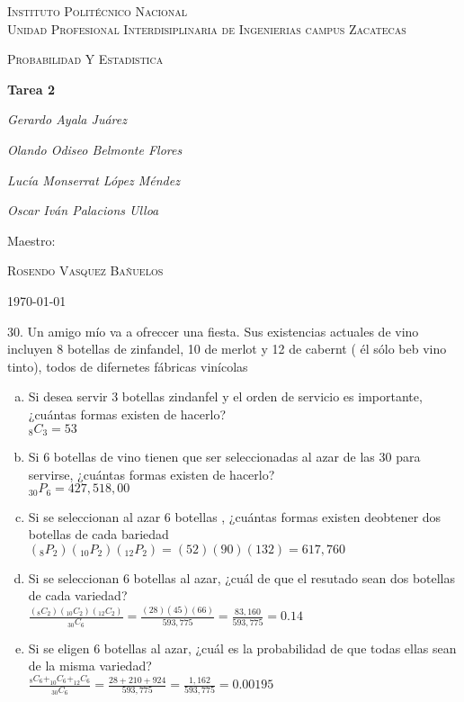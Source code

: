 \documentclass[12pt, letterpaper, spanish]{article}
\begin{document}
\begin{titlepage}
	\centering
	{\scshape\LARGE Instituto Politécnico Nacional\\ Unidad Profesional Interdisiplinaria de Ingenierias campus Zacatecas\par}
	\vspace{1cm}
	{\scshape\Large Probabilidad Y Estadistica\par}
	\vspace{1.5cm}
	{\huge\bfseries Tarea 2\par}
	\vspace{2cm}
	{\Large\itshape Gerardo Ayala Juárez\par}
	{\Large\itshape Olando Odiseo Belmonte Flores\par}
	{\Large\itshape Lucía Monserrat López Méndez\par}
	{\Large\itshape Oscar Iván Palacions Ulloa\par}
	\vfill
	Maestro:\par
	\textsc{
	Rosendo Vasquez Bañuelos}
	\vfill
	{\large \today \par}
\end{titlepage}

30. Un amigo mío va a ofreccer una fiesta. Sus existencias actuales de vino incluyen 8 botellas de zinfandel, 10 de merlot y 12 de cabernt ( él sólo beb vino tinto), todos de difernetes fábricas vinícolas
\begin{enumerate}[a)]
    \item Si desea servir 3 botellas zindanfel y el orden de servicio es importante, ¿cuántas formas existen de hacerlo?\\
    $_8C_3=53$
    \item Si 6 botellas de vino tienen que ser seleccionadas al azar de las 30 para servirse, ¿cuántas formas existen de hacerlo?\\
    $_{30}P_6=427,518,00$
    \item Si se seleccionan al azar 6 botellas , ¿cuántas formas existen deobtener dos botellas de cada bariedad\\
    $(_8P_2)(_{10}P_2)(_{12}P_2)=(52)(90)(132)=617,760$
    \item Si se seleccionan 6 botellas al azar, ¿cuál de que el resutado sean dos botellas de cada variedad?\\
    $\frac{(_8C_2)(_{10}C_2)(_{12}C_2)}{_{30}C_6}=\frac{(28)(45)(66)}{593,775}=\frac{83,160}{593,775}=0.14$
    \item Si se eligen 6 botellas al azar, ¿cuál es la probabilidad de que todas ellas sean de la misma variedad?\\
    $\frac{_8C_6+_{10}C_6+_{12}C_6}{_{30}C_6}=\frac{28+210+924}{593,775}=\frac{1,162}{593,775}=0.00195$\\
\end{enumerate}
\end{document}
